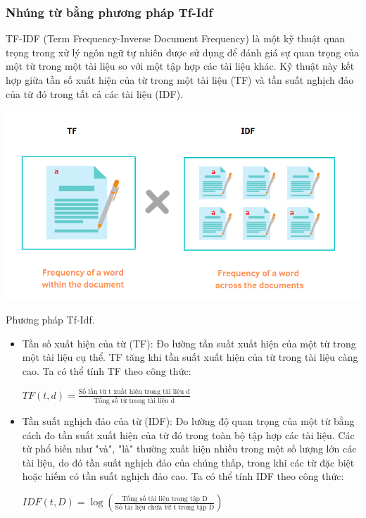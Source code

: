 \documentclass[a4paper, 12pt, openany]{book}
\begin{document}
\subsubsection{Nhúng từ bằng phương pháp Tf-Idf}


TF-IDF (Term Frequency-Inverse Document Frequency) là một kỹ thuật quan trọng trong xử lý ngôn ngữ tự nhiên được sử dụng để đánh giá sự quan trọng của một từ trong một tài liệu so với một tập hợp các tài liệu khác. Kỹ thuật này kết hợp giữa tần số xuất hiện của từ trong một tài liệu (TF) và tần suất nghịch đảo của từ đó trong tất cả các tài liệu (IDF).

\begin{minipage}{\linewidth}
    \captionsetup{type=figure}
    \centering
    \includegraphics[width=\linewidth]{./assets/images/tf-idf.png}
    \caption{Phương pháp Tf-Idf.}
\end{minipage}
\vspace{0.5cm}

\begin{itemize}
    \item Tần số xuất hiện của từ (TF): Đo lường tần suất xuất hiện của một từ trong một tài liệu cụ thể. TF tăng khi tần suất xuất hiện của từ trong tài liệu càng cao. Ta có thể tính TF theo công thức:
    \begin{center}
        \(TF(t, d) = \frac{\text{Số lần từ t xuất hiện trong tài liệu d}}{\text{Tổng số từ trong tài liệu d}}\)
    \end{center}
    
    \item Tần suất nghịch đảo của từ (IDF): Đo lường độ quan trọng của một từ bằng cách đo tần suất xuất hiện của từ đó trong toàn bộ tập hợp các tài liệu. Các từ phổ biến như "và", "là" thường xuất hiện nhiều trong một số lượng lớn các tài liệu, do đó tần suất nghịch đảo của chúng thấp, trong khi các từ đặc biệt hoặc hiếm có tần suất nghịch đảo cao.
    Ta có thể tính IDF theo công thức:

    \begin{center}
        \(IDF(t, D) = \log\left(\frac{\text{Tổng số tài liệu trong tập D}}{\text{Số tài liệu chứa từ t trong tập D}}\right)\)
    \end{center}
\end{itemize}
\end{document}
